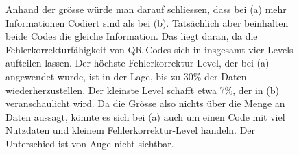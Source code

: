 % 

%
%

\begin{figure}
	\centering
	\caption{Anhand der grösse würde man darauf schliessen, dass bei (a) mehr Informationen Codiert sind als bei (b). Tatsächlich aber beinhalten beide Codes die gleiche Information. Das liegt daran, da die Fehlerkorrekturfähigkeit von QR-Codes sich in insgesamt vier Levels aufteilen lassen. Der höchste Fehlerkorrektur-Level, der bei (a) angewendet wurde, ist in der Lage, bis zu 30\% der Daten wiederherzustellen. Der kleinste Level schafft etwa 7\%, der in (b) veranschaulicht wird. Da die Grösse also nichts über die Menge an Daten aussagt, könnte es sich bei (a) auch um einen Code mit viel Nutzdaten und kleinem Fehlerkorrektur-Level handeln. Der Unterschied ist von Auge nicht sichtbar.}
	\label{fig:qr}
\end{figure}

